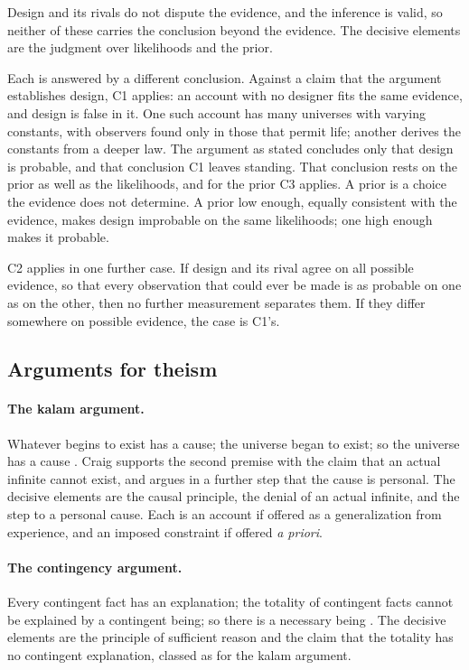 Design and its rivals do not dispute the evidence, and the inference is valid, so neither of these
carries the conclusion beyond the evidence. The decisive elements are the judgment over likelihoods
and the prior.

Each is answered by a different conclusion. Against a claim that the argument establishes design,
C1 applies: an account with no designer fits the same evidence, and design is false in it. One such
account has many universes with varying constants, with observers found only in those that permit
life; another derives the constants from a deeper law. The argument as stated concludes only that
design is probable, and that conclusion C1 leaves standing. That conclusion rests on the prior as well
as the likelihoods, and for the prior C3 applies. A prior is a choice the evidence does not determine. A prior low enough, equally
consistent with the evidence, makes design improbable on the same likelihoods; one high enough makes
it probable.

C2 applies in one further case. If design and its rival agree on all possible evidence, so that
every observation that could ever be made is as probable on one as on the other, then no further
measurement separates them. If they differ somewhere on possible evidence, the case is C1's.

\subsection{Arguments for theism}\label{ss:arguments-for}

\paragraph{The kalam argument.} Whatever begins to exist has a cause; the universe began to exist;
so the universe has a cause \citep{craig1979}. Craig supports the second premise with the claim
that an actual infinite cannot exist, and argues in a further step that the cause is personal. The
decisive elements are the causal principle, the denial of an actual infinite, and the step to a
personal cause. Each is an account if offered as a generalization from experience, and an imposed
constraint if offered \emph{a priori}.

\paragraph{The contingency argument.} Every contingent fact has an explanation; the totality of
contingent facts cannot be explained by a contingent being; so there is a necessary being
\citep{pruss2009}. The decisive elements are the principle of sufficient reason and the claim that
the totality has no contingent explanation, classed as for the kalam argument.

